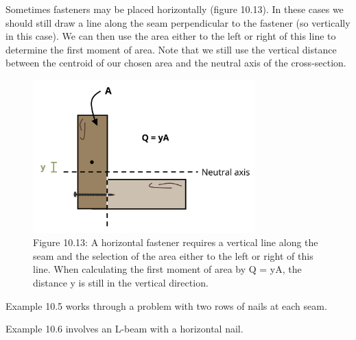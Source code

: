 \documentclass[
  letterpaper,
  DIV=11,
  numbers=noendperiod]{scrreprt}
\theoremstyle{definition}
\theoremstyle{remark}
\begin{document}
Sometimes fasteners may be placed horizontally (figure 10.13). In these
cases we should still draw a line along the seam perpendicular to the
fastener (so vertically in this case). We can then use the area either
to the left or right of this line to determine the first moment of area.
Note that we still use the vertical distance between the centroid of our
chosen area and the neutral axis of the cross-section.

\begin{figure}[H]

{\centering \includegraphics[width=3.375in,height=\textheight]{images/figure 10.13.png}

}

\caption{Figure 10.13: A horizontal fastener requires a vertical line
along the seam and the selection of the area either to the left or right
of this line. When calculating the first moment of area by Q = yA, the
distance y is still in the vertical direction.}

\end{figure}%

Example 10.5 works through a problem with two rows of nails at each
seam.

Example 10.6 involves an L-beam with a horizontal nail.
\end{document}
